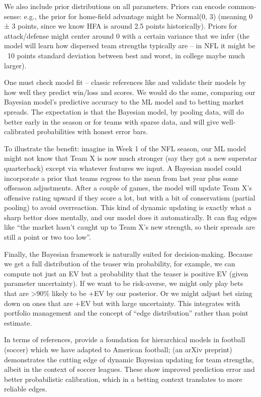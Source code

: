 \documentclass[11pt]{amsart}
\begin{document}
We also include prior distributions on all parameters. Priors can encode common-sense: e.g., the prior for home-field advantage might be Normal(0, 3) (meaning 0 ± 3 points, since we know HFA is around 2.5 points historically). Priors for attack/defense might center around 0 with a certain variance that we infer (the model will learn how dispersed team strengths typically are – in NFL it might be ~10 points standard deviation between best and worst, in college maybe much larger).

One must check model fit – classic references like \citet{Stern1991} and \citet{Baio2010} validate their models by how well they predict win/loss and scores. We would do the same, comparing our Bayesian model’s predictive accuracy to the ML model and to betting market spreads. The expectation is that the Bayesian model, by pooling data, will do better early in the season or for teams with sparse data, and will give well-calibrated probabilities with honest error bars.

To illustrate the benefit: imagine in Week 1 of the NFL season, our ML model might not know that Team X is now much stronger (say they got a new superstar quarterback) except via whatever features we input. A Bayesian model could incorporate a prior that teams regress to the mean from last year plus some offseason adjustments. After a couple of games, the model will update Team X’s offensive rating upward if they score a lot, but with a bit of conservatism (partial pooling) to avoid overreaction. This kind of dynamic updating is exactly what a sharp bettor does mentally, and our model does it automatically. It can flag edges like “the market hasn’t caught up to Team X’s new strength, so their spreads are still a point or two too low”.

Finally, the Bayesian framework is naturally suited for decision-making. Because we get a full distribution of the teaser win probability, for example, we can compute not just an EV but a probability that the teaser is positive EV (given parameter uncertainty). If we want to be risk-averse, we might only play bets that are >90\% likely to be +EV by our posterior. Or we might adjust bet sizing down on ones that are +EV but with large uncertainty. This integrates with portfolio management and the concept of “edge distribution” rather than point estimate.

In terms of references, \citet{Baio2010} provide a foundation for hierarchical models in football (soccer) which we have adapted to American football; \citet{Macri2025} (an arXiv preprint) demonstrates the cutting edge of dynamic Bayesian updating for team strengths, albeit in the context of soccer leagues. These show improved prediction error and better probabilistic calibration, which in a betting context translates to more reliable edges.
\end{document}
